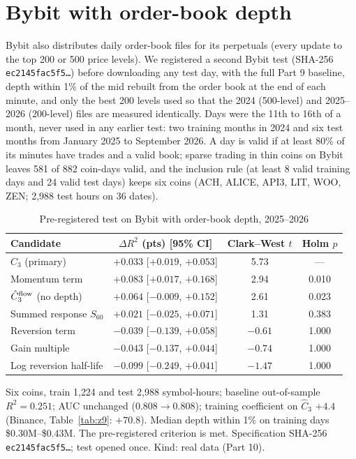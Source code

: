 \documentclass[12pt]{article}
\theoremstyle{definition}
\theoremstyle{remark}
\begin{document}
\section{Bybit with order-book depth}
Bybit also distributes daily order-book files for its perpetuals (every update to the top 200 or 500 price levels). We registered a second Bybit test (SHA-256 \texttt{ec2145fac5f5\ldots}) before downloading any test day, with the full Part 9 baseline, depth within 1\% of the mid rebuilt from the order book at the end of each minute, and only the best 200 levels used so that the 2024 (500-level) and 2025--2026 (200-level) files are measured identically. Days were the 11th to 16th of a month, never used in any earlier test: two training months in 2024 and six test months from January 2025 to September 2026. A day is valid if at least 80\% of its minutes have trades and a valid book; sparse trading in thin coins on Bybit leaves 581 of 882 coin-days valid, and the inclusion rule (at least 8 valid training days and 24 valid test days) keeps six coins (ACH, ALICE, API3, LIT, WOO, ZEN; 2{,}988 test hours on 36 dates).

\begin{table}[t]\centering\small
\begin{threeparttable}
\caption{Pre-registered test on Bybit with order-book depth, 2025--2026}\label{tab:bybitob}
\setlength{\tabcolsep}{3pt}
\begin{tabular}{lccc}
\toprule
Candidate & $\Delta R^2$ (pts) [95\% CI] & Clark--West $t$ & Holm $p$\\
\midrule
$\hat C_3$ (primary) & $+0.033$ [$+0.019$, $+0.053$] & 5.73 & ---\\
Momentum term & $+0.083$ [$+0.017$, $+0.168$] & 2.94 & 0.010\\
$\hat C_3^{\rm flow}$ (no depth) & $+0.064$ [$-0.009$, $+0.152$] & 2.61 & 0.023\\
Summed response $S_{60}$ & $+0.021$ [$-0.025$, $+0.071$] & 1.31 & 0.383\\
Reversion term & $-0.039$ [$-0.139$, $+0.058$] & $-0.61$ & 1.000\\
Gain multiple & $-0.043$ [$-0.137$, $+0.044$] & $-0.74$ & 1.000\\
Log reversion half-life & $-0.099$ [$-0.249$, $+0.041$] & $-1.47$ & 1.000\\
\bottomrule
\end{tabular}
\begin{tablenotes}\footnotesize\item Six coins, train 1{,}224 and test 2{,}988 symbol-hours; baseline out-of-sample $R^2=0.251$; AUC unchanged ($0.808\to0.808$); training coefficient on $\hat C_3$ $+4.4$ (Binance, Table~\ref{tab:z9}: $+70.8$). Median depth within 1\% on training days \$0.30M--\$0.43M. The pre-registered criterion is met. Specification SHA-256 \texttt{ec2145fac5f5\ldots}; test opened once. Kind: real data (Part 10).\end{tablenotes}
\end{threeparttable}
\end{table}
\end{document}
